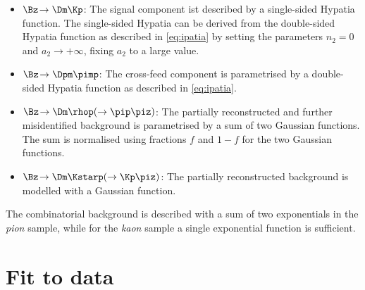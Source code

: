 \begin{itemize}
	\item $\Bz\!\to\Dm\Kp$: The signal component ist described by a single-sided Hypatia function. The single-sided Hypatia can be derived from the double-sided Hypatia function as described in \cref{eq:ipatia} by setting the parameters $n_2=0$ and $a_2\to+\infty$, \ie fixing $a_2$ to a large value.
	\item $\Bz\!\to\Dpm\pimp$: The cross-feed component is parametrised by a double-sided Hypatia function as described in \cref{eq:ipatia}.
	\item $\Bz\!\to\Dm\rhop\!\left(\to\pip\piz\right)$: The partially reconstructed and further misidentified background is parametrised by a sum of two Gaussian functions. The sum is normalised using fractions $f$ and $1-f$ for the two Gaussian functions.
	\item $\Bz\!\to\Dm\Kstarp\!\left(\to\Kp\piz\right)$: The partially reconstructed background is modelled with a Gaussian function.
\end{itemize}
The combinatorial background is described with a sum of two exponentials in the \emph{pion} sample, while for the \emph{kaon} sample a single exponential function is sufficient.

\section{Fit to data}
\label{sec:MassFitData}

